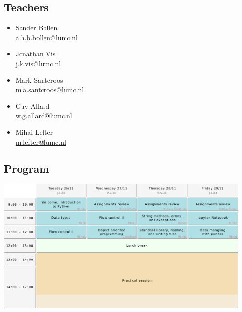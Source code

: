 \documentclass[aspectratio=1610,slidestop]{beamer}
\newcommand{\hrefcc}[2]{\textcolor{#1}{\href{#2}{#2}}}
\begin{document}
\subsection{Teachers}
\begin{pframe}
 \begin{minipage}[t]{0.5\textwidth}
  \begin{itemize}
   \item Sander Bollen \\
     \hrefcc{emailc}{a.h.b.bollen@lumc.nl}
   \item Jonathan Vis \\
     \hrefcc{emailc}{j.k.vis@lumc.nl}
   \item Mark Santcroos \\
     \hrefcc{emailc}{m.a.santcroos@lumc.nl}
   \item Guy Allard \\
     \hrefcc{emailc}{w.g.allard@lumc.nl}
   \item Mihai Lefter\\
    \hrefcc{emailc}{m.lefter@lumc.nl}
  \end{itemize}
 \end{minipage}
\end{pframe}

\subsection{Program}
\begin{pframe}
 \begin{center}
  \includegraphics[width=0.95\textwidth]{../../images/program.pdf}
 \end{center}
\end{pframe}
\end{document}
